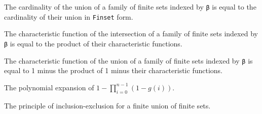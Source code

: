 \begin{lemma}\label{card_eq_FinUnion}
  The cardinality of the union of a family of finite sets indexed by \verb|β| is equal to the cardinality of their union in \verb|Finset| form.
\end{lemma}

\begin{lemma}\label{char_fun_FinInter}
  The characteristic function of the intersection of a family of finite sets indexed by \verb|β| is equal to the product of their characteristic functions.
\end{lemma}

\begin{lemma}\label{char_fun_FinUnion}
  The characteristic function of the union of a family of finite sets indexed by \verb|β| is equal to 1 minus the product of 1 minus their characteristic functions.
\end{lemma}

\begin{lemma}\label{mul_expand₀}
  The polynomial expansion of \(1 - \prod_{i=0}^{n-1} (1 - g(i))\).
\end{lemma}

\begin{theorem}\label{Principle_of_Inclusion_Exclusion}
  The principle of inclusion-exclusion for a finite union of finite sets.
\end{theorem}


